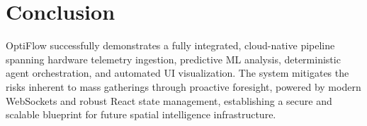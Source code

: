 \documentclass[11pt, a4paper]{article}
\begin{document}
\section{Conclusion}
OptiFlow successfully demonstrates a fully integrated, cloud-native pipeline spanning hardware telemetry ingestion, predictive ML analysis, deterministic agent orchestration, and automated UI visualization. The system mitigates the risks inherent to mass gatherings through proactive foresight, powered by modern WebSockets and robust React state management, establishing a secure and scalable blueprint for future spatial intelligence infrastructure.
\end{document}
